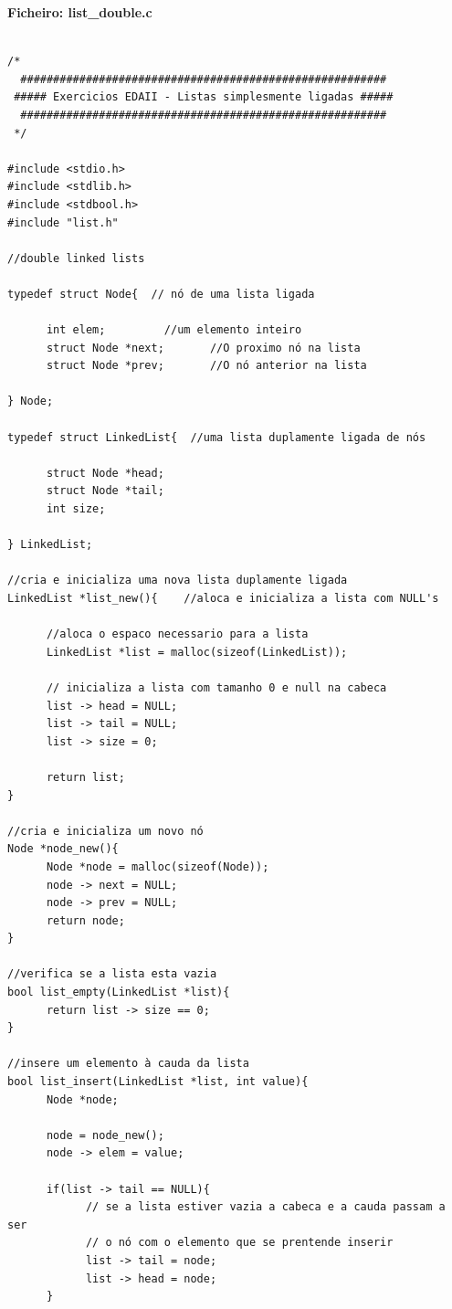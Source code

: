 \textbf{Ficheiro: list\_double.c}

\begin{verbatim}

/*
  ########################################################
 ##### Exercicios EDAII - Listas simplesmente ligadas #####
  ########################################################
 */

#include <stdio.h>
#include <stdlib.h>
#include <stdbool.h>
#include "list.h"

//double linked lists

typedef struct Node{  // nó de uma lista ligada

      int elem;         //um elemento inteiro
      struct Node *next;       //O proximo nó na lista
      struct Node *prev;       //O nó anterior na lista

} Node;

typedef struct LinkedList{  //uma lista duplamente ligada de nós

      struct Node *head;
      struct Node *tail;
      int size;

} LinkedList;

//cria e inicializa uma nova lista duplamente ligada 
LinkedList *list_new(){    //aloca e inicializa a lista com NULL's 

      //aloca o espaco necessario para a lista
      LinkedList *list = malloc(sizeof(LinkedList));  

      // inicializa a lista com tamanho 0 e null na cabeca
      list -> head = NULL;
      list -> tail = NULL;
      list -> size = 0;

      return list;
}

//cria e inicializa um novo nó
Node *node_new(){
      Node *node = malloc(sizeof(Node));
      node -> next = NULL;
      node -> prev = NULL;
      return node;
}

//verifica se a lista esta vazia
bool list_empty(LinkedList *list){
      return list -> size == 0;  
}

//insere um elemento à cauda da lista
bool list_insert(LinkedList *list, int value){
      Node *node;

      node = node_new();
      node -> elem = value;

      if(list -> tail == NULL){
            // se a lista estiver vazia a cabeca e a cauda passam a ser
            // o nó com o elemento que se prentende inserir	
            list -> tail = node;
            list -> head = node; 
      }


\end{verbatim}
